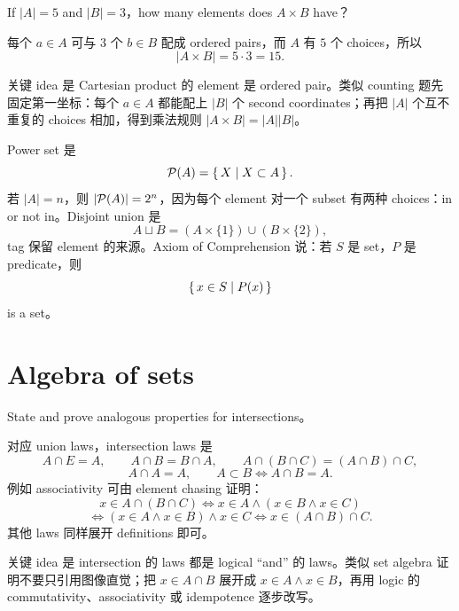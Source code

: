 \begin{exerciseblock}
If \(|A|=5\) and \(|B|=3\)，how many elements does \(A\times B\) have？
\end{exerciseblock}

\begin{solution}
每个 \(a\in A\) 可与 \(3\) 个 \(b\in B\) 配成 ordered pairs，而 \(A\) 有 \(5\) 个 choices，所以
\[
|A\times B|=5\cdot 3=15.
\]
\end{solution}

\begin{explanation}
关键 idea 是 Cartesian product 的 element 是 ordered pair。类似 counting 题先固定第一坐标：每个 \(a\in A\) 都能配上 \(|B|\) 个 second coordinates；再把 \(|A|\) 个互不重复的 choices 相加，得到乘法规则 \(|A\times B|=|A||B|\)。
\end{explanation}

Power set 是
\[
\mathcal{P}(A)=\left\{\,X\mid X\subset A\,\right\}.
\]
若 \(|A|=n\)，则 \(|\mathcal{P}(A)|=2^n\)，因为每个 element 对一个 subset 有两种 choices：in or not in。Disjoint union 是
\[
A\sqcup B=(A\times\{1\})\cup(B\times\{2\}),
\]
tag 保留 element 的来源。Axiom of Comprehension 说：若 \(S\) 是 set，\(P\) 是 predicate，则
\[
\left\{\,x\in S\mid P(x)\,\right\}
\]
is a set。

\section{Algebra of sets}

\begin{exerciseblock}
State and prove analogous properties for intersections。
\end{exerciseblock}

\begin{solution}
对应 union laws，intersection laws 是
\[
A\cap E=A,\qquad A\cap B=B\cap A,\qquad
A\cap(B\cap C)=(A\cap B)\cap C,
\]
\[
A\cap A=A,\qquad
A\subset B\Longleftrightarrow A\cap B=A.
\]
例如 associativity 可由 element chasing 证明：
\[
x\in A\cap(B\cap C)
\Longleftrightarrow x\in A\land(x\in B\land x\in C)
\]
\[
\Longleftrightarrow (x\in A\land x\in B)\land x\in C
\Longleftrightarrow x\in(A\cap B)\cap C.
\]
其他 laws 同样展开 definitions 即可。
\end{solution}

\begin{explanation}
关键 idea 是 intersection 的 laws 都是 logical ``and'' 的 laws。类似 set algebra 证明不要只引用图像直觉；把 \(x\in A\cap B\) 展开成 \(x\in A\land x\in B\)，再用 logic 的 commutativity、associativity 或 idempotence 逐步改写。
\end{explanation}

